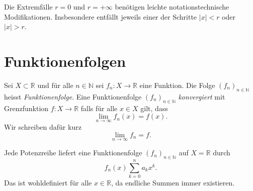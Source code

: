 \documentclass[../main.tex]{subfiles}
\begin{document}
\begin{remark}
  Die Extremfälle $r = 0$ und $r = +\infty$ benötigen leichte notationstechnische
  Modifikationen. Insbesondere entfällt jeweils einer der Schritte
  $|x| < r$ oder $|x| > r$.
\end{remark}

\section{Funktionenfolgen}
\begin{definition}
  Sei $X \subset \mathbb{R}$ und für alle $n \in \mathbb{N}$ sei $f_n \colon X \to \mathbb{R}$ 
  eine Funktion. Die Folge ${(f_{n})}_{n \in \mathbb{N}}$ heisst
  \emph{Funktionenfolge}.
  Eine Funktionenfolge ${(f_{n})}_{n \in \mathbb{N}}$ \emph{konvergiert}
  mit Grenzfunktion $f \colon X \to \mathbb{R}$ falls für alle $x \in X$ 
  gilt, dass
  \[
    \lim_{n \to \infty} f_n(x) = f(x).
  \]
  Wir schreiben dafür kurz
  \[
    \lim_{n \to \infty} f_n = f.
  \]
\end{definition}

\begin{remark}
  Jede Potenzreihe liefert eine Funktionenfolge ${(f_{n})}_{n \in \mathbb{N}}$ auf $X = \mathbb{R}$ 
  durch
  \[
    f_n(x) \sum_{k=0}^{n} a_k x^k.
  \]
  Das ist wohldefiniert für alle $x \in \mathbb{R}$, da endliche Summen immer existieren.
\end{remark}
\end{document}
